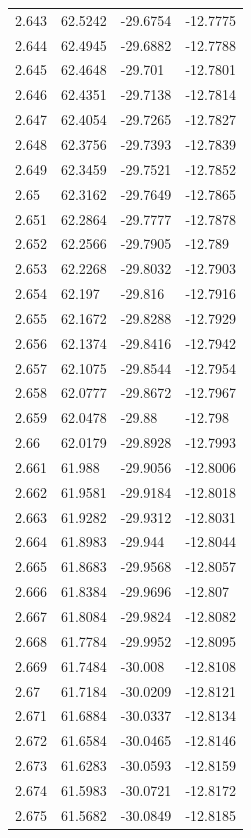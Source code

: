 \begin{tabular}{llll}
2.643 & 62.5242 & -29.6754 & -12.7775 \\
2.644 & 62.4945 & -29.6882 & -12.7788 \\
2.645 & 62.4648 & -29.701 & -12.7801 \\
2.646 & 62.4351 & -29.7138 & -12.7814 \\
2.647 & 62.4054 & -29.7265 & -12.7827 \\
2.648 & 62.3756 & -29.7393 & -12.7839 \\
2.649 & 62.3459 & -29.7521 & -12.7852 \\
2.65 & 62.3162 & -29.7649 & -12.7865 \\
2.651 & 62.2864 & -29.7777 & -12.7878 \\
2.652 & 62.2566 & -29.7905 & -12.789 \\
2.653 & 62.2268 & -29.8032 & -12.7903 \\
2.654 & 62.197 & -29.816 & -12.7916 \\
2.655 & 62.1672 & -29.8288 & -12.7929 \\
2.656 & 62.1374 & -29.8416 & -12.7942 \\
2.657 & 62.1075 & -29.8544 & -12.7954 \\
2.658 & 62.0777 & -29.8672 & -12.7967 \\
2.659 & 62.0478 & -29.88 & -12.798 \\
2.66 & 62.0179 & -29.8928 & -12.7993 \\
2.661 & 61.988 & -29.9056 & -12.8006 \\
2.662 & 61.9581 & -29.9184 & -12.8018 \\
2.663 & 61.9282 & -29.9312 & -12.8031 \\
2.664 & 61.8983 & -29.944 & -12.8044 \\
2.665 & 61.8683 & -29.9568 & -12.8057 \\
2.666 & 61.8384 & -29.9696 & -12.807 \\
2.667 & 61.8084 & -29.9824 & -12.8082 \\
2.668 & 61.7784 & -29.9952 & -12.8095 \\
2.669 & 61.7484 & -30.008 & -12.8108 \\
2.67 & 61.7184 & -30.0209 & -12.8121 \\
2.671 & 61.6884 & -30.0337 & -12.8134 \\
2.672 & 61.6584 & -30.0465 & -12.8146 \\
2.673 & 61.6283 & -30.0593 & -12.8159 \\
2.674 & 61.5983 & -30.0721 & -12.8172 \\
2.675 & 61.5682 & -30.0849 & -12.8185 \\

\end{tabular}
